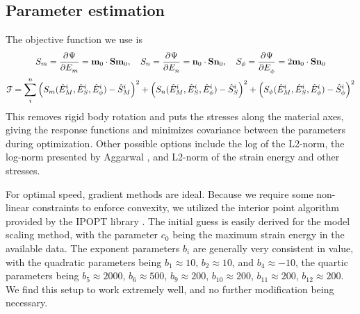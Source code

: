     
    



	









\subsection{Parameter estimation}

	The objective function we use is 
\begin{subequations}\label{eqn:objectivefunction}
\begin{gather}
S_m = \dpd{\Psi}{E_m} = \mathbf{m}_0\cdot\mathbf{S}\mathbf{m}_0,
	\quad S_n = \dpd{\Psi}{E_n} = \mathbf{n}_0\cdot\mathbf{S}\mathbf{n}_0,
    \quad S_\phi = \dpd{\Psi}{E_\phi} = 2\mathbf{m}_0\cdot\mathbf{S}\mathbf{n}_0 \label{eqn:responsefunctions}\\
\mathcal{F} = \sum_i^n \left(S_m(\hat{E}_M^i, \hat{E}_S^i, \hat{E}_\phi^i) - \hat{S}_M^i \right)^2 + \left(S_n(\hat{E}_M^i, \hat{E}_S^i, \hat{E}_\phi^i) - \hat{S}_S^i \right)^2 + \left(S_\phi(\hat{E}_M^i, \hat{E}_S^i, \hat{E}_\phi^i) - \hat{S}_\phi^i \right)^2
\end{gather}
\end{subequations}
    This removes rigid body rotation and puts the stresses along the material axes, giving the response functions and minimizes covariance between the parameters during optimization. Other possible options include the log of the L2-norm, the log-norm presented by Aggarwal \cite{aggarwal_improved_2017}, and L2-norm of the strain energy and other stresses.


	For optimal speed, gradient methods are ideal. Because we require some non-linear constraints to enforce convexity, we utilized the interior point algorithm provided by the IPOPT library \cite{waechter_implementation_2005}. The initial guess is easily derived for the model scaling method, with the parameter $c_0$ being the maximum strain energy in the available data. The exponent parameters $b_i$ are generally very consistent in value, with the quadratic parameters being $b_1 \approx 10$, $b_2 \approx 10$, and $b_4 \approx -10$, the quartic parameters being $b_5 \approx 2000$, $b_6 \approx 500$, $b_9 \approx 200$, $b_{10} \approx 200$, $b_{11} \approx 200$, $b_{12} \approx 200$. We find this setup to work extremely well, and no further modification being necessary. 




